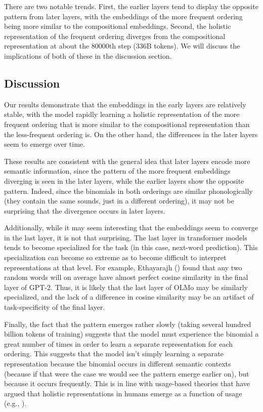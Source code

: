 \documentclass[
  12pt,
  letterpaper,
]{scrreport}
\begin{document}
There are two notable trends. First, the earlier layers tend to display
the opposite pattern from later layers, with the embeddings of the more
frequent ordering being more similar to the compositional embeddings.
Second, the holistic representation of the frequent ordering diverges
from the compositional representation at about the 80000th step (336B
tokens). We will discuss the implications of both of these in the
discussion section.

\subsection{Discussion}\label{discussion-9}

Our results demonstrate that the embeddings in the early layers are
relatively stable, with the model rapidly learning a holistic
representation of the more frequent ordering that is more similar to the
compositional representation than the less-frequent ordering is. On the
other hand, the differences in the later layers seem to emerge over
time.

These results are consistent with the general idea that later layers
encode more semantic information, since the pattern of the more frequent
embeddings diverging is seen in the later layers, while the earlier
layers show the opposite pattern. Indeed, since the binomials in both
orderings are similar phonologically (they contain the same sounds, just
in a different ordering), it may not be surprising that the divergence
occurs in later layers.

Additionally, while it may seem interesting that the embeddings seem to
converge in the last layer, it is not that surprising. The last layer in
transformer models tends to become specialized for the task (in this
case, next-word prediction). This specialization can become so extreme
as to become difficult to interpret representations at that level. For
example, Ethayarajh
() found that any two
random words will on average have almost perfect cosine similarity in
the final layer of GPT-2. Thus, it is likely that the last layer of OLMo
may be similarly specialized, and the lack of a difference in cosine
similarity may be an artifact of task-specificity of the final layer.

Finally, the fact that the pattern emerges rather slowly (taking several
hundred billion tokens of training) suggests that the model must
experience the binomial a great number of times in order to learn a
separate representation for each ordering. This suggests that the model
isn't simply learning a separate representation because the binomial
occurs in different semantic contexts (because if that were the case we
would see the pattern emerge earlier on), but because it occurs
frequently. This is in line with usage-based theories that have argued
that holistic representations in humans emerge as a function of usage
(e.g., ).
\end{document}
